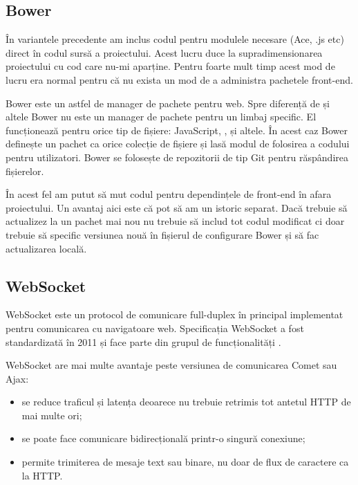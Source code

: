 \documentclass[a4wide,12pt]{report}
\newcommand{\eng}[1]{{#1}} %
\newcommand{\acr}[1]{{\textsmaller[1]{\textsc{#1}}}} %
\begin{document}
\subsection{Bower}
\label{bowersub}

În variantele precedente am inclus codul pentru modulele necesare (Ace,
\acr{PDF}.js etc) direct în codul sursă a proiectului. Acest lucru duce la
supradimensionarea proiectului cu cod care nu-mi aparține. Pentru foarte mult
timp acest mod de lucru era normal pentru că nu exista un mod de a administra
pachetele \eng{front-end}.

Bower este un astfel de manager de pachete pentru web. Spre diferență de
\acr{NPM} și altele Bower nu este un manager de pachete pentru un limbaj
specific. El funcționează pentru orice tip de fișiere: JavaScript, \acr{HTML},
\acr{CSS} și altele. În acest caz Bower definește un pachet ca orice colecție de
fișiere și lasă modul de folosirea a codului pentru utilizatori. Bower se
folosește de repozitorii de tip Git pentru răspândirea fișierelor.

În acest fel am putut să mut codul pentru dependințele de front-end în afara
proiectului. Un avantaj aici este că pot să am un istoric separat. Dacă trebuie
să actualizez la un pachet mai nou nu trebuie să includ tot codul modificat ci
doar trebuie să specific versiunea nouă în fișierul de configurare Bower și să
fac actualizarea locală.

\subsection{WebSocket}
\label{websocketsub}

WebSocket este un protocol de comunicare \eng{full-duplex} în principal
implementat pentru comunicarea cu navigatoare web. Specificația WebSocket a fost
standardizată în 2011 și face parte din grupul de funcționalități \acr{HTML5}.

WebSocket are mai multe avantaje peste versiunea de comunicarea Comet sau Ajax:

\begin{itemize}

\item se reduce traficul și latența deoarece nu trebuie retrimis tot antetul
HTTP de mai multe ori;

\item se poate face comunicare bidirecțională printr-o singură conexiune;

\item permite trimiterea de mesaje text sau binare, nu doar de flux de caractere
ca la HTTP.

\end{itemize}
\end{document}
